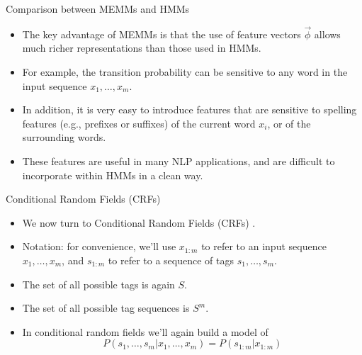 \documentclass[handout]{beamer}
\begin{document}
\begin{frame}{Comparison between MEMMs and HMMs}
\begin{scriptsize}

\begin{itemize}

\item  The key advantage of MEMMs is that the use of feature vectors $\vec{\phi}$ allows much
richer representations than those used in HMMs.

\item For example, the transition probability can be sensitive to any word in the input sequence $x_1, \dots, x_m$.

\item In addition, it is very easy to introduce features that are sensitive to spelling features (e.g., prefixes or suffixes) of the current word $x_i$, or of the surrounding words.

\item These features are useful in many NLP applications, and are difficult to incorporate within HMMs in a clean way.

\end{itemize}

\end{scriptsize}
\end{frame}



\begin{frame}{Conditional Random Fields (CRFs)}
\begin{scriptsize}

\begin{itemize}

\item  We now turn to Conditional Random Fields (CRFs) \cite{Lafferty:2001:CRF:645530.655813}.

\item Notation: for convenience, we'll use $x_{1:m}$ to refer to an input sequence $x_1 ,\dots,x_m$, and $s_{1:m}$ to refer to a sequence of tags $s_1, \dots, s_m$.

\item The set of all possible tags is again $S$.

\item The set of all possible tag sequences is $S^m$.

\item In conditional random fields we'll again build a model of
\begin{displaymath}
 P(s_1, \dots, s_m | x_1, \dots, x_m) = P(s_{1:m}|x_{1:m})
\end{displaymath}


\end{itemize}

\end{scriptsize}
\end{frame}
\end{document}

